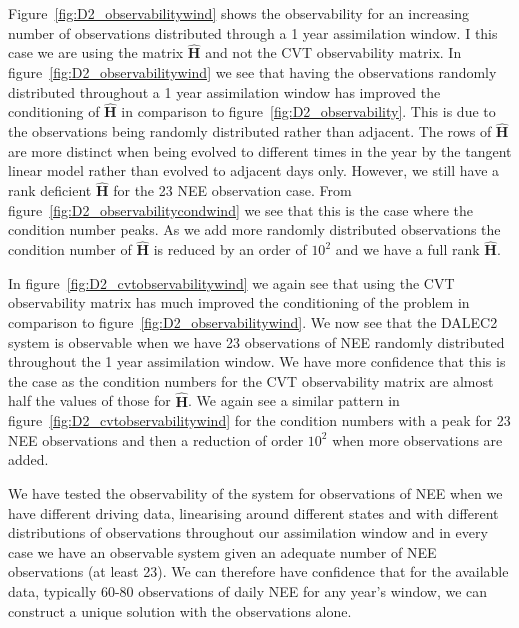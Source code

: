 \documentclass[11pt]{article}
\begin{document}
Figure~\ref{fig:D2_observabilitywind} shows the observability for an increasing number of observations distributed through a 1 year assimilation window. I this case we are using the matrix $\hat{\textbf{H}}$ and not the CVT observability matrix. In figure~\ref{fig:D2_observabilitywind} we see that having the observations randomly distributed throughout a 1 year assimilation window has improved the conditioning of $\hat{\textbf{H}}$ in comparison to figure~\ref{fig:D2_observability}. This is due to the observations being randomly distributed rather than adjacent. The rows of $\hat{\textbf{H}}$ are more distinct when being evolved to different times in the year by the tangent linear model rather than evolved to adjacent days only. However, we still have a rank deficient $\hat{\textbf{H}}$ for the 23 NEE observation case. From figure~\ref{fig:D2_observabilitycondwind} we see that this is the case where the condition number peaks. As we add more randomly distributed observations the condition number of $\hat{\textbf{H}}$ is reduced by an order of $10^{2}$ and we have a full rank $\hat{\textbf{H}}$. 

In figure~\ref{fig:D2_cvtobservabilitywind} we again see that using the CVT observability matrix has much improved the conditioning of the problem in comparison to figure~\ref{fig:D2_observabilitywind}. We now see that the DALEC2 system is observable when we have 23 observations of NEE randomly distributed throughout the 1 year assimilation window. We have more confidence that this is the case as the condition numbers for the CVT observability matrix are almost half the values of those for $\hat{\textbf{H}}$. We again see a similar pattern in figure~\ref{fig:D2_cvtobservabilitywind} for the condition numbers with a peak for 23 NEE observations and then a reduction of order $10^{2}$ when more observations are added. 

We have tested the observability of the system for observations of NEE when we have different driving data, linearising around different states and with different distributions of observations throughout our assimilation window and in every case we have an observable system given an adequate number of NEE observations (at least 23). We can therefore have confidence that for the available data, typically 60-80 observations of daily NEE for any year's window, we can construct a unique solution with the observations alone.
\end{document}
